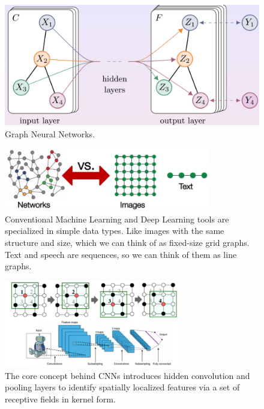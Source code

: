 \begin{figure}[H]
	\centering
	\includegraphics[width=\textwidth]{
		images/16_DeepLearning_graphNeuralNetwork.png
	}
	\caption{Graph Neural Networks.}
	\label{fig:graph_neural_networks}
\end{figure}

\begin{figure}[H]
	\centering
	\includegraphics[width=0.8\textwidth]{
		images/16_DeepLearning_graphNeuralNetworksImages.png
	}
	\caption{Conventional Machine Learning and Deep Learning tools are specialized
	in simple data types. Like images with the same structure and size, which we
	can think of as fixed-size grid graphs. Text and speech are sequences, so we
	can think of them as line graphs.}
	\label{fig:networksVsImages}
\end{figure}

\begin{figure}[H]
	\centering
	\includegraphics[width=0.68\textwidth]{
        images/16_DeepLearning_cnnImages.png
    }
	\caption{The core concept behind CNNs introduces hidden convolution and
	pooling layers to identify spatially localized features via a set of receptive
	fields in kernel form.}
	\label{fig:cnnOnAnImage}
\end{figure}

